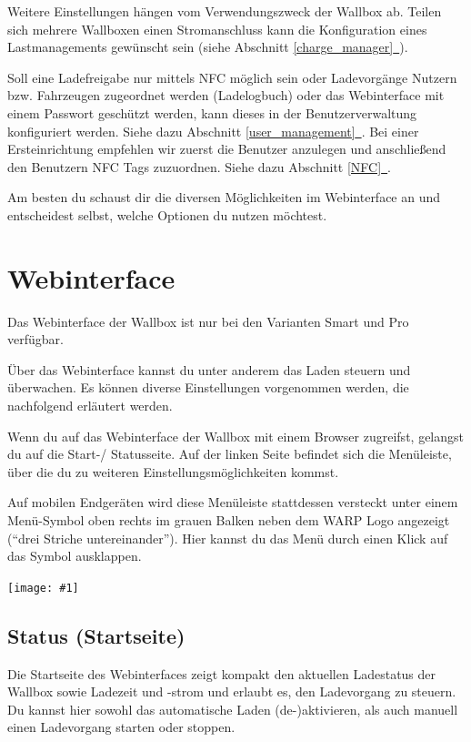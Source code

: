 \documentclass[a4paper,10pt]{article}
\newcommand{\gfx}[1]{\texttt{[image: \#1]}}
\newcommand*{\fullref}[1]{Abschnitt \hyperref[{#1}]{\ref*{#1}~\nameref*{#1}}}
\begin{document}
\begin{multicols*}{2}
    Weitere Einstellungen hängen vom Verwendungszweck der Wallbox ab. Teilen
    sich mehrere Wallboxen einen Stromanschluss kann die Konfiguration eines
    Lastmanagements gewünscht sein (siehe \fullref{charge_manager}).

    Soll eine Ladefreigabe
    nur mittels NFC möglich sein oder Ladevorgänge Nutzern bzw. Fahrzeugen
    zugeordnet werden (Ladelogbuch) oder das Webinterface mit einem Passwort
    geschützt werden, kann dieses in der Benutzerverwaltung konfiguriert werden.
	Siehe dazu \fullref{user_management}.
    Bei einer Ersteinrichtung empfehlen wir zuerst die Benutzer anzulegen und
    anschließend den Benutzern NFC Tags zuzuordnen. Siehe dazu \fullref{NFC}.

    Am besten du schaust dir die diversen Möglichkeiten im Webinterface an und
    entscheidest selbst, welche Optionen du nutzen möchtest.

    \section{Webinterface}\label{webinterface}
    Das Webinterface der Wallbox ist nur bei den Varianten Smart und Pro verfügbar.

    Über das Webinterface kannst du unter anderem das Laden steuern und überwachen.
    Es können diverse Einstellungen vorgenommen werden, die nachfolgend
    erläutert werden.

    Wenn du auf das Webinterface der Wallbox mit einem Browser zugreifst,
    gelangst du auf die Start-/ Statusseite. Auf der linken Seite befindet sich
    die Menüleiste, über die du zu weiteren Einstellungsmöglichkeiten kommst.

    Auf mobilen Endgeräten wird
    diese Menüleiste stattdessen versteckt unter einem Menü-Symbol oben rechts
    im grauen Balken neben dem WARP Logo angezeigt (\enquote{drei Striche untereinander}).
    Hier kannst du das Menü durch einen Klick auf das Symbol ausklappen.

    \gfx{./img_warp2/resized/web_status}

    \subsection{Status (Startseite)}

    Die Startseite des Webinterfaces zeigt kompakt den aktuellen Ladestatus der
    Wallbox sowie Ladezeit und -strom und erlaubt es, den Ladevorgang zu steuern.
    Du kannst hier sowohl das automatische Laden (de-)aktivieren, als auch
    manuell einen Ladevorgang starten oder stoppen.


\end{multicols*}
\end{document}

